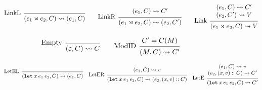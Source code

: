 \documentclass{article}
\theoremstyle{definition}
\newcommand*{\cons}{::}
\newcommand*{\semarrow}{\rightsquigarrow}
\newcommand*{\link}[2]{{#1}\rtimes{#2}}
\begin{document}
\begin{figure}[h!]
  \[
    \begin{prooftree}
      \infer[left label=LinkL]0{
      (\link{e_{1}}{e_{2}}, C)
      \semarrow
      (e_{1}, C)
      }
    \end{prooftree}\qquad
    \begin{prooftree}
      \hypo{
        \begin{matrix}
          (e_{1}, C)
          \semarrow
          C'
        \end{matrix}
      }
      \infer[left label=LinkR]1{
      (\link{e_{1}}{e_{2}}, C)
      \semarrow
      (e_{2}, C')
      }
    \end{prooftree}\qquad
    \begin{prooftree}
      \hypo{
        \begin{matrix}
          (e_{1}, C)
          \semarrow
          C' \\
          (e_{2}, C')
          \semarrow
          V
        \end{matrix}
      }
      \infer[left label=Link]1{
      (\link{e_{1}}{e_{2}}, C)
      \semarrow
      V
      }
    \end{prooftree}
  \]

  \[
    \begin{prooftree}
      \infer[left label=Empty]0{
      (\varepsilon, C)
      \semarrow
      C
      }
    \end{prooftree}\qquad
    \begin{prooftree}
      \hypo{C'=C(M)}
      \infer[left label=ModID]1{
      (M, C)
      \semarrow
      C'
      }
    \end{prooftree}
  \]

  \[
    \begin{prooftree}
      \infer[left label=LetEL]0{
      (\mathtt{let}\:x\:e_1\:e_2, C)
      \semarrow
      (e_{1}, C)
      }
    \end{prooftree}\quad
    \begin{prooftree}
      \hypo{
        \begin{matrix}
          (e_{1}, C)
          \semarrow
          v
        \end{matrix}
      }
      \infer[left label=LetER]1{
      (\mathtt{let}\:x\:e_1\:e_2, C)
      \semarrow
      (e_{2}, (x, v)\cons C)
      }
    \end{prooftree}\quad
    \begin{prooftree}
      \hypo{
        \begin{matrix}
          (e_{1}, C)
          \semarrow
          v \\
          (e_{2}, (x, v)\cons C)
          \semarrow
          C'
        \end{matrix}
      }
      \infer[left label=LetE]1{
      (\mathtt{let}\:x\:e_1\:e_2, C)
      \semarrow
      C'
      }
    \end{prooftree}
  \]


\end{figure}
\end{document}
